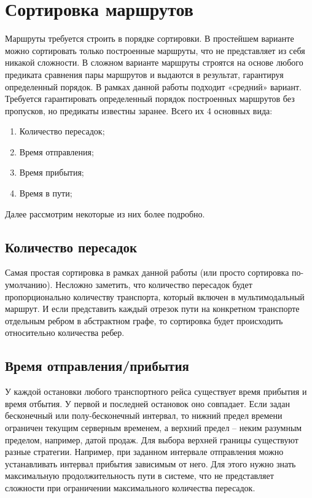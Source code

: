 \section{Сортировка маршрутов}
Маршруты требуется строить в порядке сортировки. В простейшем варианте можно сортировать только построенные маршруты, что не представляет из себя никакой сложности. В сложном варианте маршруты строятся на основе любого предиката сравнения пары маршрутов и выдаются в результат, гарантируя определенный порядок. В рамках данной работы подходит «средний» вариант. Требуется гарантировать определенный порядок построенных маршрутов без пропусков, но предикаты известны заранее. Всего их 4 основных вида:
\begin{enumerate}
    \item Количество пересадок;
    \item Время отправления;
    \item Время прибытия;
    \item Время в пути;
\end{enumerate}

Далее рассмотрим некоторые из них более подробно.

\subsection{Количество пересадок}
Самая простая сортировка в рамках данной работы (или просто сортировка по-умолчанию). Несложно заметить, что количество пересадок будет пропорционально количеству транспорта, который включен в мультимодальный маршрут. И если представить каждый отрезок пути на конкретном транспорте отдельным ребром в абстрактном графе, то сортировка будет происходить относительно количества ребер.

\subsection{Время отправления/прибытия}
У каждой остановки любого транспортного рейса существует время прибытия и время отбытия. У первой и последней остановок оно совпадает. Если задан бесконечный или полу-бесконечный интервал, то нижний предел времени ограничен текущим серверным временем, а верхний предел -- неким разумным пределом, например, датой продаж. Для выбора верхней границы существуют разные стратегии. Например, при заданном интервале отправления можно устанавливать интервал прибытия зависимым от него. Для этого нужно знать максимальную продолжительность пути в системе, что не представляет сложности при ограничении максимального количества пересадок.

